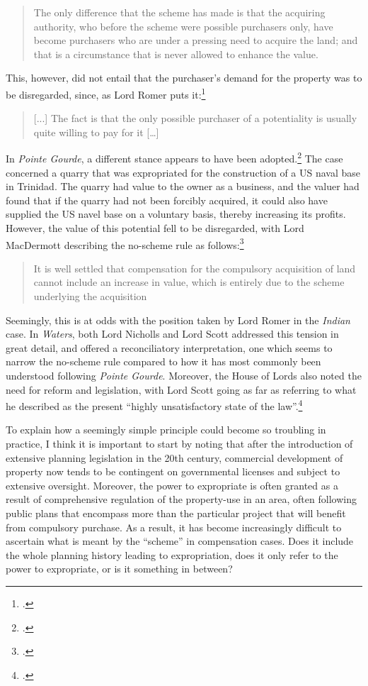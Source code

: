 \begin{quote}
The only difference that the scheme has made is that the acquiring
authority, who before the scheme were possible purchasers only, have
become purchasers who are under a pressing need to acquire the
land; and that is a circumstance that is never allowed to enhance the
value.
\end{quote}

This, however, did not entail that the purchaser's demand for the property was to be disregarded, since, as Lord Romer puts it:\footcite[316-317]{indian39}

\begin{quote}
[...] The fact is that the only possible purchaser of a potentiality is
usually quite willing to pay for it […]
\end{quote}

In \emph{Pointe Gourde}, a different stance appears to have been adopted.\footcite{gourde47} The case concerned a quarry that was expropriated for the construction of a US naval base in Trinidad. The quarry had value to the owner as a business, and the valuer had found that if the quarry had not been forcibly acquired, it could also have supplied the US navel base on a voluntary basis, thereby increasing its profits. However, the value of this potential fell to be disregarded, with Lord MacDermott describing the no-scheme rule as follows:\footcite[572]{gourde47}

\begin{quote}
It is well settled that compensation for the compulsory acquisition of
land cannot include an increase in value, which is entirely due to the
scheme underlying the acquisition
\end{quote}

Seemingly, this is at odds with the position taken by Lord Romer in the {\it Indian} case. In \emph{Waters}, both Lord Nicholls and Lord Scott addressed this tension in great detail, and offered a reconciliatory interpretation, one which seems to narrow the no-scheme rule compared to how it has most commonly been understood following \emph{Pointe Gourde}. Moreover, the House of Lords also noted the need for reform and legislation, with Lord Scott going as far as referring to what he described as the present ``highly unsatisfactory state of the law''.\footcite[164]{waters04}

To explain how a seemingly simple principle could become so troubling in practice, I think it is important to start by noting that after the introduction of extensive planning legislation in the 20th century, commercial development of property now tends to be contingent on governmental licenses and subject to extensive oversight. Moreover, the power to expropriate is often granted as a result of comprehensive regulation of the property-use in an area, often following public plans that encompass more than the particular project that will benefit from compulsory purchase. As a result, it has become increasingly difficult to ascertain what is meant by the ``scheme'' in compensation cases. Does it include the whole planning history leading to expropriation, does it only refer to the power to expropriate, or is it something in between?

